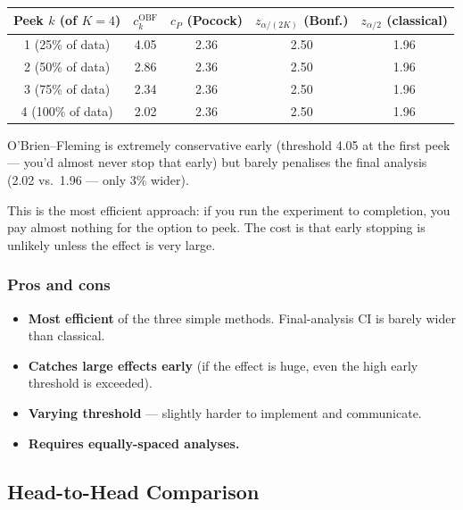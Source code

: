 \documentclass[12pt, a4paper]{article}
\begin{document}
\begin{center}
\renewcommand{\arraystretch}{1.3}
\begin{tabular}{@{} c c c c c @{}}
\toprule
Peek $k$ (of $K{=}4$) & $c_k^{\text{OBF}}$ & $c_P$ (Pocock) &
  $z_{\alpha/(2K)}$ (Bonf.) & $z_{\alpha/2}$ (classical) \\
\midrule
1 (25\% of data) & 4.05 & 2.36 & 2.50 & 1.96 \\
2 (50\% of data) & 2.86 & 2.36 & 2.50 & 1.96 \\
3 (75\% of data) & 2.34 & 2.36 & 2.50 & 1.96 \\
4 (100\% of data) & 2.02 & 2.36 & 2.50 & 1.96 \\
\bottomrule
\end{tabular}
\end{center}

\begin{plainlanguage}
O'Brien--Fleming is extremely conservative early (threshold 4.05 at the
first peek --- you'd almost never stop that early) but barely penalises
the final analysis (2.02 vs.\ 1.96 --- only 3\% wider).

This is the most efficient approach: if you run the experiment to completion,
you pay almost nothing for the option to peek.  The cost is that early
stopping is unlikely unless the effect is very large.
\end{plainlanguage}

\subsubsection*{Pros and cons}

\begin{itemize}[nosep]
  \item[\textcolor{green!60!black}{+}] \textbf{Most efficient} of the three
        simple methods.  Final-analysis CI is barely wider than classical.
  \item[\textcolor{green!60!black}{+}] \textbf{Catches large effects early}
        (if the effect is huge, even the high early threshold is exceeded).
  \item[\textcolor{red}{--}] \textbf{Varying threshold} --- slightly harder
        to implement and communicate.
  \item[\textcolor{red}{--}] \textbf{Requires equally-spaced analyses.}
\end{itemize}


\subsection{Head-to-Head Comparison}
\end{document}

